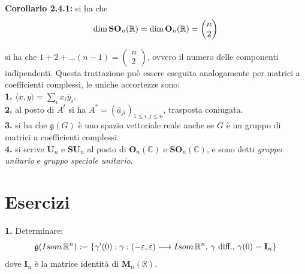 \documentclass[oneside, 11pt]{amsbook}
\makeatletter
\newcommand{\0}{{(0)}}
\newcommand{\3}{{(3)}}
\theoremstyle{colonplain}
\theoremstyle{colondefinition}
\theoremstyle{colonremark}
\numberwithin{equation}{chapter}
\renewcommand{\proofname}{Dimostrazione}
\renewenvironment{proof}[1][\proofname]{\par
  \pushQED{\qed}%
  \normalfont \topsep6\p@\@plus6\p@\relax
  \trivlist
  \item[\hskip\labelsep\bfseries #1:]\ignorespaces
}{%
  \popQED\endtrivlist\@endpefalse
}
\makeatother
\begin{document}
\textbf{Corollario 2.4.1:} si ha che
\begin{align}
    \dim \mathbf{SO}_n(\mathbb{R}) = \dim \mathbf{O}_n(\mathbb{R}) = \begin{pmatrix}
        n \\
        2
    \end{pmatrix} \notag
\end{align}

\begin{proof} si ha che $1 + 2 + \dots (n - 1) = \begin{pmatrix}
    n \\
    2
\end{pmatrix}$, ovvero il numero delle componenti indipendenti. \end{proof}
Questa trattazione può essere eseguita analogamente per matrici a coefficienti complessi, le uniche accortezze sono: \\
\textbf{1.} $\langle x, y \rangle = \sum_i x_i \overline{y}_i$. \\
\textbf{2.} al posto di $A^t$ si ha $A^* = (\overline{a}_{ji})_{1 \leq i, j \leq n}$, trasposta coniugata. \\
\textbf{3.} si ha che $\mathfrak{g}(G)$ è uno spazio vettoriale reale anche se $G$ è un gruppo di matrici a coefficienti complessi. \\
\textbf{4.} si scrive $\mathbf{U}_n$ e $\mathbf{SU}_n$ al posto di $\mathbf{O}_n(\mathbb{C})$ e $\mathbf{SO}_n(\mathbb{C})$, e sono detti \textit{gruppo unitario} e \textit{gruppo speciale unitario}.

\section{Esercizi}
\textbf{1.} Determinare: 
\begin{equation}
    \mathfrak{g}(Isom\, \mathbb{R}^n) := \{ \gamma ' (0) : \gamma : (- \varepsilon, \varepsilon) \longrightarrow Isom\, \mathbb{R}^n, \, \gamma \text{ diff.}, \, \gamma(0) = \mathbf{I}_n \} \notag
\end{equation} 
dove $\mathbf{I}_n$ è la matrice identità di $\mathbf{M}_n(\mathbb{R})$. \\
\end{document}
